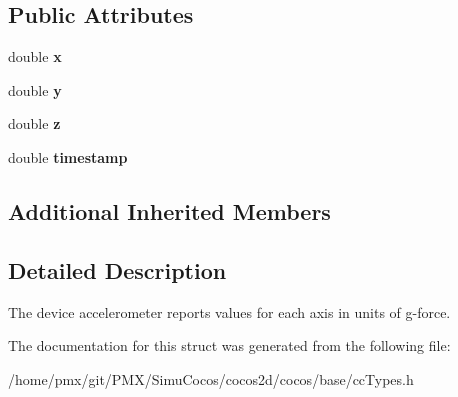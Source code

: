 \subsection*{Public Attributes}
\begin{DoxyCompactItemize}
\item 
\mbox{\label{classAcceleration_a0bff6ce0096b2316a0202a383f8f5220}} 
double {\bfseries x}
\item 
\mbox{\label{classAcceleration_a1c8302954bb9e57ac37d0addaed4f0f2}} 
double {\bfseries y}
\item 
\mbox{\label{classAcceleration_a834046cb09eb52bba39e89a59b2fa0a9}} 
double {\bfseries z}
\item 
\mbox{\label{classAcceleration_aa85c01bbf150cd66970b8f3453cf285b}} 
double {\bfseries timestamp}
\end{DoxyCompactItemize}
\subsection*{Additional Inherited Members}


\subsection{Detailed Description}
The device accelerometer reports values for each axis in units of g-\/force. 

The documentation for this struct was generated from the following file\+:\begin{DoxyCompactItemize}
\item 
/home/pmx/git/\+P\+M\+X/\+Simu\+Cocos/cocos2d/cocos/base/cc\+Types.\+h\end{DoxyCompactItemize}
